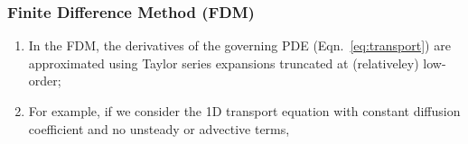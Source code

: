 \documentclass[10pt,compress]{beamer}
\begin{document}
\begin{frame}
 \frametitle{Finite Difference Method (FDM)} 

\begin{enumerate}
  \item <1-> In the FDM, the derivatives of the governing PDE (Eqn.~\ref{eq:transport}) are approximated using Taylor series expansions truncated at (relativeley) low-order;
  \item <2-> For example, if we consider the 1D transport equation with constant diffusion coefficient and no unsteady or advective terms,
\end{enumerate}  
 
\end{frame}
\end{document}
